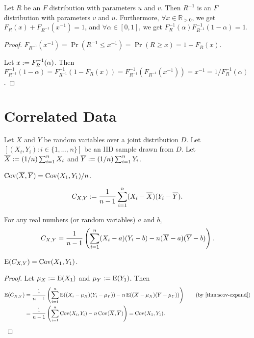 \documentclass[a4paper, 12pt, fleqn]{article}
\DeclareMathOperator*{\Cov}{Cov}
\begin{document}
\begin{lemma}
Let $R$ be an $F$ distribution with parameters $u$ and $v$.
Then $R^{-1}$ is an $F$ distribution with parameters $v$ and $u$.
Furthermore, $\forall x \in \mathbb{R}_{> 0}$, we get $F_R(x) + F_{R^{-1}}(x^{-1}) = 1$,
and $\forall \alpha \in [0, 1]$, we get $F_R^{-1}(\alpha)F_{R^{-1}}^{-1}(1-\alpha) = 1$.
\end{lemma}
\begin{proof}
$F_{R^{-1}}(x^{-1}) = \Pr(R^{-1} \le x^{-1}) = \Pr(R \ge x) = 1 - F_R(x)$.

Let $x := F_R^{-1}(\alpha)$. Then
\\ $F_{R^{-1}}^{-1}(1-\alpha) = F_{R^{-1}}^{-1}(1 - F_R(x))
= F_{R^{-1}}^{-1}(F_{R^{-1}}(x^{-1})) = x^{-1} = 1/F_R^{-1}(\alpha)$.
\end{proof}

\section{Correlated Data}

Let $X$ and $Y$ be random variables over a joint distribution $D$.
Let $[(X_i, Y_i): i \in \{1, \ldots, n\}]$ be an IID sample drawn from $D$.
Let $\overline{X} := (1/n)\sum_{i=1}^n X_i$ and $\overline{Y} := (1/n)\sum_{i=1}^n Y_i$.

\begin{theorem}
$\Cov(\Xbar, \Ybar) = \Cov(X_1, Y_1)/n$.
\end{theorem}

\begin{definition}
\[ C_{X,Y} := \frac{1}{n-1} \sum_{i=1}^n (X_i-\overline{X})(Y_i-\overline{Y}). \]
\end{definition}

\begin{claim}
\label{thm:scov-expand}
For any real numbers (or random variables) $a$ and $b$,
\[ C_{X,Y} = \frac{1}{n-1}\left(\sum_{i=1}^n (X_i-a)(Y_i-b) - n(\overline{X}-a)(\overline{Y}-b) \right). \]
\end{claim}

\begin{theorem}
$\E(C_{X,Y}) = \Cov(X_1, Y_1)$.
\end{theorem}
\begin{proof}
Let $\mu_X := \operatorname*{E}(X_1)$ and $\mu_Y := \operatorname*{E}(Y_1)$. Then
\begin{align*}
\E(C_{X,Y}) &= \frac{1}{n-1}\left(\sum_{i=1}^n \E((X_i-\mu_X)(Y_i-\mu_Y)) - n\E((\Xbar-\mu_X)(\Ybar-\mu_Y))\right)
    \tag{by \cref{thm:scov-expand}}
\\ &= \frac{1}{n-1}\left(\sum_{i=1}^n \Cov(X_i, Y_i) - n\Cov(\Xbar, \Ybar)\right) = \Cov(X_1, Y_1).
\qedhere \end{align*}
\end{proof}
\end{document}

